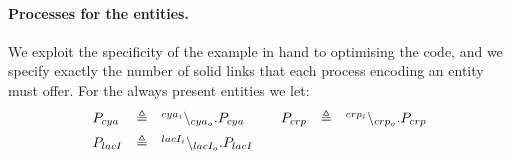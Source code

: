 \paragraph{Processes for the entities.}
We exploit the specificity of the example in hand to optimising the code, and we specify exactly
the number of solid links that each process encoding an entity must offer.
For the always present entities we let:
\[
\begin{array}{lcl@{\qquad}lcl}
P_{cya}&\defeq&\link{cya_i}{cya_o}.P_{cya} &
P_{crp}&\defeq&\link{crp_i}{crp_o}.P_{crp}\\[5pt]
P_{lacI}&\defeq& \link{lacI_i}{lacI_o}.P_{lacI} &

\end{array}\]
